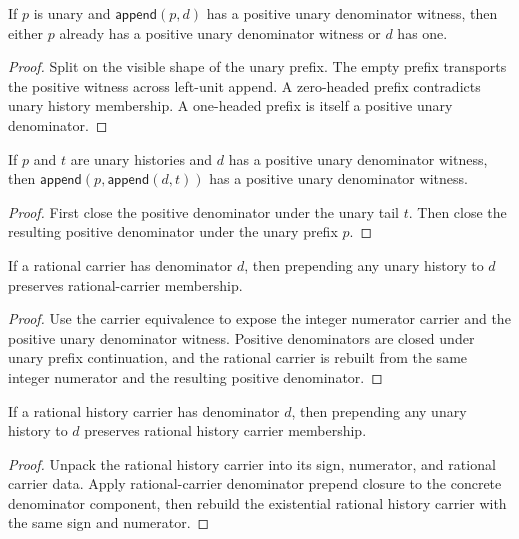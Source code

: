 \begin{theorem}
\label{thm:positive-unary-denominator-append-unary-left-split}
If $p$ is unary and $\mathsf{append}(p,d)$ has a positive unary denominator
witness, then either $p$ already has a positive unary denominator witness or
$d$ has one.
\end{theorem}
\begin{proof}
Split on the visible shape of the unary prefix. The empty prefix transports the
positive witness across left-unit append. A zero-headed prefix contradicts unary
history membership. A one-headed prefix is itself a positive unary denominator.
\end{proof}

\begin{theorem}
\label{thm:rat-positive-denominator-append-unary-context}
If $p$ and $t$ are unary histories and $d$ has a positive unary denominator
witness, then $\mathsf{append}(p,\mathsf{append}(d,t))$ has a positive unary
denominator witness.
\end{theorem}
\begin{proof}
First close the positive denominator under the unary tail $t$. Then close the
resulting positive denominator under the unary prefix $p$.
\end{proof}

\begin{theorem}
\label{thm:rat-carrier-prepend-unary-denominator-closed}
If a rational carrier has denominator \(d\), then prepending any unary history
to \(d\) preserves rational-carrier membership.
\end{theorem}
\begin{proof}
Use the carrier equivalence to expose the integer numerator carrier and the
positive unary denominator witness. Positive denominators are closed under
unary prefix continuation, and the rational carrier is rebuilt from the same
integer numerator and the resulting positive denominator.
\end{proof}

\begin{theorem}
\label{thm:rat-history-carrier-prepend-unary-denominator-closed}
If a rational history carrier has denominator \(d\), then prepending any unary
history to \(d\) preserves rational history carrier membership.
\end{theorem}
\begin{proof}
Unpack the rational history carrier into its sign, numerator, and rational
carrier data. Apply rational-carrier denominator prepend closure to the
concrete denominator component, then rebuild the existential rational history
carrier with the same sign and numerator.
\end{proof}

